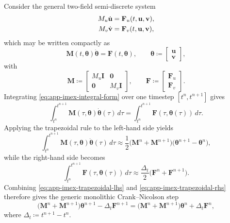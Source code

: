 Consider the general two-field semi-discrete system
\begin{align}
    M_u \dot{\mathbf{u}} & = \mathbf{F}_u(t,\mathbf{u},\mathbf{v}), \notag \\
    M_v \dot{\mathbf{v}} & = \mathbf{F}_v(t,\mathbf{u},\mathbf{v}),
\end{align}
which may be written compactly as
\begin{equation}
    \mathbf{M}(t,\boldsymbol{\theta}) \dot{\boldsymbol{\theta}}
    =
    \mathbf{F}(t,\boldsymbol{\theta}),
    \qquad
    \boldsymbol{\theta} \coloneqq
    \begin{bmatrix}
        \mathbf{u} \\
        \mathbf{v}
    \end{bmatrix},
    \label{eq:app-imex-integral-form}
\end{equation}
with
\[
    \mathbf{M}
    \coloneqq
    \begin{bmatrix}
        M_u \mathbf{I} & \mathbf{0}     \\
        \mathbf{0}     & M_v \mathbf{I}
    \end{bmatrix},
    \qquad
    \mathbf{F}
    \coloneqq
    \begin{bmatrix}
        \mathbf{F}_u \\
        \mathbf{F}_v
    \end{bmatrix}.
\]
Integrating \eqref{eq:app-imex-integral-form} over one timestep $[t^n,t^{n+1}]$ gives
\begin{equation}
    \int_{t^n}^{t^{n+1}} \mathbf{M}(\tau,\boldsymbol{\theta}) \dot{\boldsymbol{\theta}}(\tau)\, d\tau
    =
    \int_{t^n}^{t^{n+1}} \mathbf{F}(\tau,\boldsymbol{\theta}(\tau))\, d\tau .
\end{equation}
Applying the trapezoidal rule to the left-hand side yields
\begin{equation}
    \int_{t^n}^{t^{n+1}} \mathbf{M}(\tau,\boldsymbol{\theta}) \dot{\boldsymbol{\theta}}(\tau)\, d\tau
    \approx
    \frac{1}{2}
    \bigl(\mathbf{M}^n + \mathbf{M}^{n+1}\bigr)
    \bigl(\boldsymbol{\theta}^{n+1} - \boldsymbol{\theta}^n\bigr),
    \label{eq:app-imex-trapezoidal-lhs}
\end{equation}
while the right-hand side becomes
\begin{equation}
    \int_{t^n}^{t^{n+1}} \mathbf{F}(\tau,\boldsymbol{\theta}(\tau))\, d\tau
    \approx
    \frac{\Delta_t}{2}
    \bigl(\mathbf{F}^n + \mathbf{F}^{n+1}\bigr).
    \label{eq:app-imex-trapezoidal-rhs}
\end{equation}
Combining \eqref{eq:app-imex-trapezoidal-lhs} and \eqref{eq:app-imex-trapezoidal-rhs} therefore gives the generic monolithic Crank--Nicolson step
\begin{equation}
    \bigl(\mathbf{M}^n + \mathbf{M}^{n+1}\bigr)\boldsymbol{\theta}^{n+1}
    - \Delta_t \mathbf{F}^{n+1}
    =
    \bigl(\mathbf{M}^n + \mathbf{M}^{n+1}\bigr)\boldsymbol{\theta}^{n}
    + \Delta_t \mathbf{F}^{n},
    \label{eq:app-imex-general-form}
\end{equation}
where $\Delta_t \coloneqq t^{n+1}-t^n$.

